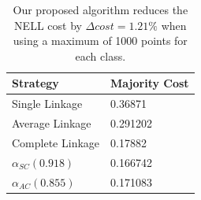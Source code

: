 \begin{table}[h]
    \centering
    \begin{tabular}{|l | l|}
    \hline
    Strategy & Majority Cost\\ \hline
    Single Linkage & 0.36871\\
    Average Linkage & 0.291202\\
    Complete Linkage & 0.17882\\
    $\alpha_{SC}(0.918)$ & 0.166742\\
    $\alpha_{AC}(0.855)$ & 0.171083\\\hline
    \end{tabular}
    \caption{Our proposed algorithm reduces the NELL cost by $\Delta cost = 1.21\%$ when using a maximum of 1000 points for each class.}
    \label{table:nell1000}
\end{table}

